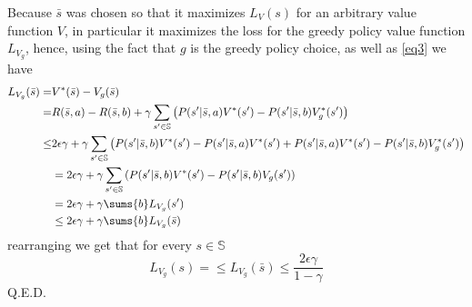 Because $\bar{s}$ was chosen so that it maximizes $L_V(s)$ for an arbitrary value function $V$, in particular it maximizes the loss for the greedy policy value function $L_{V_g}$, hence, using the fact that $g$ is the greedy policy choice, as well as \eqref{eq3} we have
\begin{align*}
L_{V_g}(\bar{s}) = & V^*(\bar{s}) - V_g(\bar{s}) \\
= & R(\bar{s},a)-R(\bar{s},b) + \gamma \sum_{s'\in\mathbb{S}}\left( P(s' | \bar{s},a) V^*(s') - P(s' | \bar{s}, b) V_g^*(s')\right) \\
\leq & 2\epsilon \gamma + \gamma \sum_{s'\in\mathbb{S}}\left( P(s' | \bar{s},b) V^*(s') - P(s' | \bar{s},a) V^*(s') + P(s' | \bar{s}, a) V^*(s') - P(s' | \bar{s},b) V_g^*(s')\right)\\
&= 2\epsilon \gamma + \gamma \sum_{s'\in\mathbb{S}}\left( P(s' | \bar{s},b) V^*(s') - P(s' | \bar{s},b) V_g(s')\right)\\
&=2\epsilon \gamma + \gamma \sums{b} L_{V_g}(s')\\
&\leq 2\epsilon\gamma + \gamma \sums{b} L_{V_g}(\bar{s})
\end{align*}
rearranging we get that for every $s\in\mathbb{S}$
\begin{equation*}
L_{V_g}(s) = \leq L_{V_g}(\bar{s}) \leq \frac{2\epsilon\gamma}{1-\gamma}
\end{equation*}
Q.E.D.
